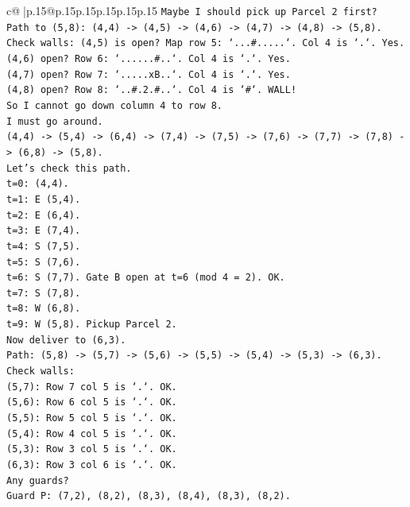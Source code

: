 \documentclass{article}
\begin{document}
{\begin{supertabular}{c@{$\;$}|p{.15\linewidth}@{}p{.15\linewidth}p{.15\linewidth}p{.15\linewidth}p{.15\linewidth}p{.15\linewidth}}
{{{\texttt{Maybe I should pick up Parcel 2 first?} \\
\texttt{Path to (5,8): (4,4) {-}> (4,5) {-}> (4,6) {-}> (4,7) {-}> (4,8) {-}> (5,8).} \\
\texttt{Check walls: (4,5) is open? Map row 5: `...\#.....`. Col 4 is `.`. Yes.} \\
\texttt{(4,6) open? Row 6: `......\#..`. Col 4 is `.`. Yes.} \\
\texttt{(4,7) open? Row 7: `.....xB..`. Col 4 is `.`. Yes.} \\
\texttt{(4,8) open? Row 8: `..\#.2.\#..`. Col 4 is `\#`. WALL!} \\
\texttt{So I cannot go down column 4 to row 8.} \\
\texttt{I must go around.} \\
\texttt{(4,4) {-}> (5,4) {-}> (6,4) {-}> (7,4) {-}> (7,5) {-}> (7,6) {-}> (7,7) {-}> (7,8) {-}> (6,8) {-}> (5,8).} \\
\texttt{Let's check this path.} \\
\texttt{t=0: (4,4).} \\
\texttt{t=1: E (5,4).} \\
\texttt{t=2: E (6,4).} \\
\texttt{t=3: E (7,4).} \\
\texttt{t=4: S (7,5).} \\
\texttt{t=5: S (7,6).} \\
\texttt{t=6: S (7,7). Gate B open at t=6 (mod 4 = 2). OK.} \\
\texttt{t=7: S (7,8).} \\
\texttt{t=8: W (6,8).} \\
\texttt{t=9: W (5,8). Pickup Parcel 2.} \\
\texttt{Now deliver to (6,3).} \\
\texttt{Path: (5,8) {-}> (5,7) {-}> (5,6) {-}> (5,5) {-}> (5,4) {-}> (5,3) {-}> (6,3).} \\
\texttt{Check walls:} \\
\texttt{(5,7): Row 7 col 5 is `.`. OK.} \\
\texttt{(5,6): Row 6 col 5 is `.`. OK.} \\
\texttt{(5,5): Row 5 col 5 is `.`. OK.} \\
\texttt{(5,4): Row 4 col 5 is `.`. OK.} \\
\texttt{(5,3): Row 3 col 5 is `.`. OK.} \\
\texttt{(6,3): Row 3 col 6 is `.`. OK.} \\
\texttt{Any guards?} \\
\texttt{Guard P: (7,2), (8,2), (8,3), (8,4), (8,3), (8,2).} \\
}}}
\end{supertabular}}
\end{document}
